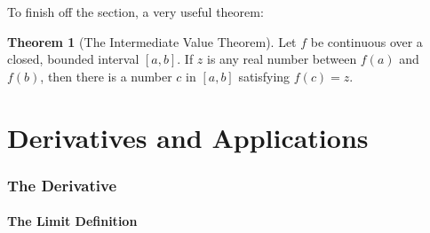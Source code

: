 \documentclass{article}
\theoremstyle{definition}
\newtheorem{theorem}{Theorem}[section]
\theoremstyle{definition}
\newenvironment{thm}[1][]{
\begin{tcolorbox}[colback=white!97!black, arc=0in]
\begin{theorem}[#1]
}{
\end{theorem}
\end{tcolorbox}
}
\begin{document}
\noindent To finish off the section, a very useful theorem:

\begin{thm}[The Intermediate Value Theorem]
Let $f$ be continuous over a closed, bounded interval $[a, b]$. If $z$ is any real number between $f(a)$ and $f(b)$, then there is a number $c$ in $[a, b]$ satisfying $f(c)=z$.
\end{thm}



\newpage



\part{Derivatives and Applications}


\section{The Derivative}

\subsection{The Limit Definition}
\end{document}
